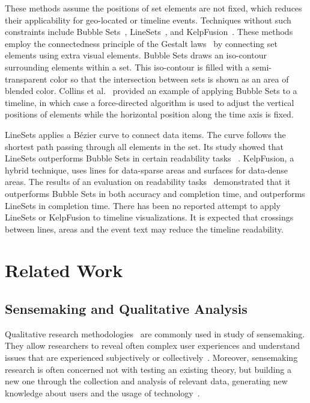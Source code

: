 These methods assume the positions of set elements are not fixed, which reduces their applicability for geo-located or timeline events. Techniques without such constraints include Bubble Sets~\cite{Collins2009a}, LineSets~\cite{Alper2011}, and KelpFusion~\cite{Meulemans2013}. These methods employ the connectedness principle of the Gestalt laws~\cite{Palmer1994} by connecting set elements using extra visual elements. Bubble Sets draws an iso-contour surrounding elements within a set. This iso-contour is filled with a semi-transparent color so that the intersection between sets is shown as an area of blended color. Collins et al.~\cite{Collins2009a} provided an example of applying Bubble Sets to a timeline, in which case a force-directed algorithm is used to adjust the vertical positions of elements while the horizontal position along the time axis is fixed. 

LineSets applies a B\'{e}zier curve to connect data items. The curve follows the shortest path passing through all elements in the set. Its study showed that LineSets outperforms Bubble Sets in certain readability tasks ~\cite{Alper2011}. KelpFusion, a hybrid technique, uses lines for data-sparse areas and surfaces for data-dense areas. The results of an evaluation on readability tasks~\cite{Meulemans2013} demonstrated that it outperforms Bubble Sets in both accuracy and completion time, and outperforms LineSets in completion time. There has been no reported attempt to apply LineSets or KelpFusion to timeline visualizations. It is expected that crossings between lines, areas and the event text may reduce the timeline readability.







\section{Related Work}

\subsection{Sensemaking and Qualitative Analysis}
Qualitative research methodologies~\cite{adams2008qualititative} are commonly used in study of sensemaking. They allow researchers to reveal often complex user experiences and understand issues that are experienced subjectively or collectively~\cite{Pace2004327, adams2008qualititative}. Moreover, sensemaking research is often concerned not with testing an existing theory, but building a new one through the collection and analysis of relevant data, generating new knowledge about users and the usage of technology~\cite{rogers2012hci}.


